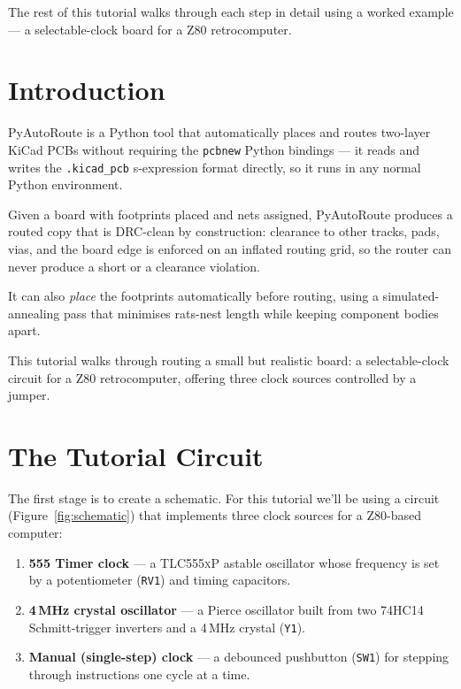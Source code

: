 \documentclass[11pt,a4paper]{article}
\begin{document}
The rest of this tutorial walks through each step in detail using a worked
example --- a selectable-clock board for a Z80 retrocomputer.

\section{Introduction}

PyAutoRoute is a Python tool that automatically places and routes
two-layer KiCad PCBs without requiring the \texttt{pcbnew} Python
bindings --- it reads and writes the \texttt{.kicad\_pcb} s-expression
format directly, so it runs in any normal Python environment.

Given a board with footprints placed and nets assigned, PyAutoRoute
produces a routed copy that is DRC-clean by construction: clearance to
other tracks, pads, vias, and the board edge is enforced on an
inflated routing grid, so the router can never produce a short or a
clearance violation.

It can also \emph{place} the footprints automatically before routing,
using a simulated-annealing pass that minimises rats-nest length while
keeping component bodies apart.

This tutorial walks through routing a small but realistic board: a
selectable-clock circuit for a Z80 retrocomputer, offering three clock
sources controlled by a jumper.

\section{The Tutorial Circuit}

The first stage is to create a schematic. For this tutorial we'll be using
a circuit (Figure~\ref{fig:schematic}) that implements three clock
sources for a Z80-based computer:

\begin{enumerate}
    \item \textbf{555 Timer clock} --- a \textsc{TLC555xP} astable
          oscillator whose frequency is set by a potentiometer
          (\texttt{RV1}) and timing capacitors.
    \item \textbf{4\,MHz crystal oscillator} --- a Pierce oscillator
          built from two \textsc{74HC14} Schmitt-trigger inverters and
          a 4\,MHz crystal (\texttt{Y1}).
    \item \textbf{Manual (single-step) clock} --- a debounced
          pushbutton (\texttt{SW1}) for stepping through instructions
          one cycle at a time.
\end{enumerate}
\end{document}
